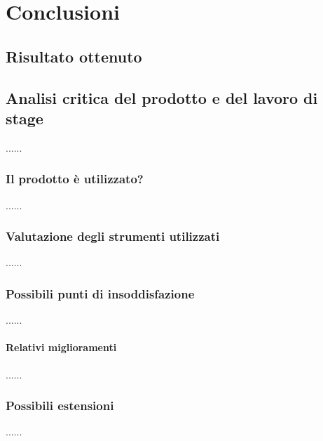 
\chapter{Conclusioni}
\label{cap:conclusioni}

\section{Risultato ottenuto}

\section{Analisi critica del prodotto e del lavoro di stage}
......


\subsection{Il prodotto è utilizzato?}
......


\subsection{Valutazione degli strumenti utilizzati}
......

\subsection{Possibili punti di insoddisfazione}
......

\subsubsection{Relativi miglioramenti}
......

\subsection{Possibili estensioni}
......